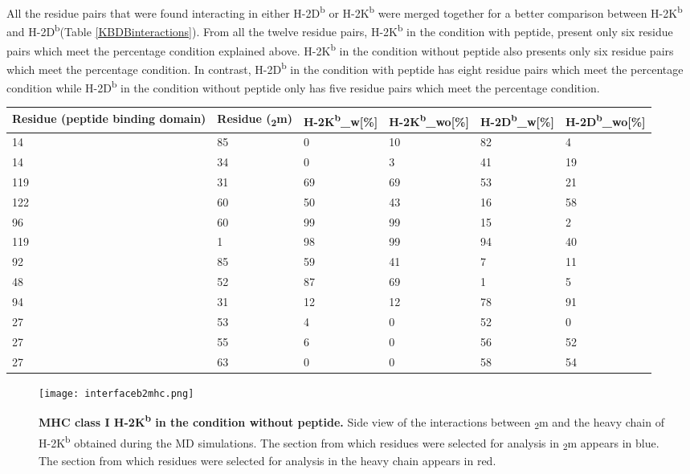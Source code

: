 \documentclass[11pt,twocolumn]{article}
\newcommand{\db}{H-2D\textsuperscript{b}\xspace}
\newcommand{\dbw}{H-2D\textsuperscript{b}\_w\xspace}
\newcommand{\dbwo}{H-2D\textsuperscript{b}\_wo\xspace}
\newcommand{\kb}{H-2K\textsuperscript{b}\xspace}
\newcommand{\kbw}{H-2K\textsuperscript{b}\_w\xspace}
\newcommand{\kbwo}{H-2K\textsuperscript{b}\_wo\xspace}
\newcommand{\angstr}{{\AA}ngstroms\xspace}
\newcommand{\btm}{\textbeta\textsubscript{2}m\xspace}
\begin{document}
All the residue pairs that were found interacting in either \db or \kb were merged together for a better comparison between \kb and \db  (Table \ref{KBDBinteractions}). From all the twelve residue pairs, \kb in the condition with peptide, present only six residue pairs which meet the percentage condition explained above. \kb in the condition without peptide also presents only six residue pairs which meet the percentage condition. In contrast, \db in the condition with peptide has eight residue pairs which meet the percentage condition while \db in the condition without peptide only has five residue pairs which meet the percentage condition. 

   



\begin{table*}
\caption{\textbf{ Compilation of the the interacting residues used for the analysis of \kb and \db, and the percentage of interactions bellow below four \angstr, of each analysed condition.} The residues interacting coming from the peptide binding domain, the residues interacting coming from \btm and the percentage of their interaction which is below four \angstr is analysed in \db and \kb for the condition of with peptide and without peptide}
\label{KBDBinteractions}
\begin{tabularx}{\linewidth}{|X|X|X|X|X|X|}  \hline
Residue (peptide binding domain)&Residue (\btm)&\kbw [\%]&\kbwo [\%]&\dbw [\%]&\dbwo [\%]\\ \hline
14&85&0&10&82&4\\ \hline
14&34&0&3&41&19\\ \hline
119&31&69&69&53&21\\ \hline
122&60&50&43&16&58\\ \hline
96&60&99&99&15&2\\ \hline
119&1&98&99&94&40\\ \hline
92&85&59&41&7&11\\ \hline
48&52&87&69&1&5\\ \hline
94&31&12&12&78&91\\ \hline
27&53&4&0&52&0\\ \hline
27&55&6&0&56&52\\ \hline
27&63&0&0&58&54\\ \hline
\end{tabularx}
\end{table*}



\begin{figure}
\texttt{[image: interfaceb2mhc.png]}
\caption{\textbf{MHC class I \kb in the condition without peptide.} Side view of the interactions between \btm and the heavy chain of \kb obtained during the MD simulations. The section from which residues were selected for analysis in \btm appears in blue. The section from which residues were selected for analysis in the heavy chain appears in red.}
\label{interface}
\end{figure}
\end{document}
